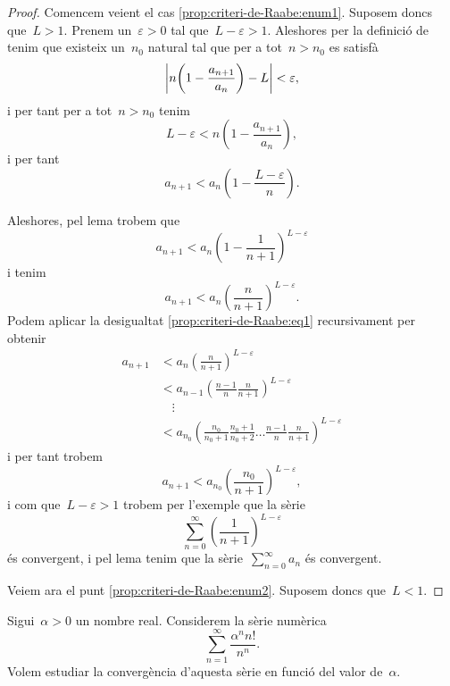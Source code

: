 \documentclass[../analisi-matematica.tex]{subfiles}
\begin{document}
    \begin{proof}
        Comencem veient el cas \eqref{prop:criteri-de-Raabe:enum1}.
        Suposem doncs que~\(L>1\).
        Prenem un~\(\varepsilon>0\) tal que~\(L-\varepsilon>1\).
        Aleshores per la definició de  tenim que existeix un~\(n_{0}\) natural tal que per a tot~\(n>n_{0}\) es satisfà
        \[
            \abs{n\left(1-\frac{a_{n+1}}{a_{n}}\right)-L}<\varepsilon,
        \]
        i per tant per a tot~\(n>n_{0}\) tenim
        \[
            L-\varepsilon<n\left(1-\frac{a_{n+1}}{a_{n}}\right),
        \]
        i per tant
        \[
            a_{n+1}<a_{n}\left(1-\frac{L-\varepsilon}{n}\right).
        \]

        Aleshores, pel lema  trobem que
        \[
            a_{n+1}<a_{n}\left(1-\frac{1}{n+1}\right)^{L-\varepsilon}
        \]
        i tenim
        \begin{equation}
            \label{prop:criteri-de-Raabe:eq1}
            a_{n+1}<a_{n}\left(\frac{n}{n+1}\right)^{L-\varepsilon}.
        \end{equation}
        Podem aplicar la desigualtat \eqref{prop:criteri-de-Raabe:eq1} recursivament per obtenir
        \begin{align*}
            a_{n+1}&<a_{n}\left(\frac{n}{n+1}\right)^{L-\varepsilon}\\
            &<a_{n-1}\left(\frac{n-1}{n}\frac{n}{n+1}\right)^{L-\varepsilon}\\
            &\quad\vdots\\
            &<a_{n_{0}}\left(\frac{n_{0}}{n_{0}+1}\frac{n_{0}+1}{n_{0}+2}\dots\frac{n-1}{n}\frac{n}{n+1}\right)^{L-\varepsilon}
        \end{align*}
        i per tant trobem
        \[
            a_{n+1}<a_{n_{0}}\left(\frac{n_{0}}{n+1}\right)^{L-\varepsilon},
        \]
        i com que~\(L-\varepsilon>1\) trobem per l'exemple  que la sèrie
        \[
            \sum_{n=0}^{\infty}\left(\frac{1}{n+1}\right)^{L-\varepsilon}
        \]
        és convergent, i pel lema  tenim que la sèrie~\(\sum_{n=0}^{\infty}a_{n}\) és convergent.

        Veiem ara el punt \eqref{prop:criteri-de-Raabe:enum2}.
        Suposem doncs que~\(L<1\).
    \end{proof}
    \begin{example}
        \label{ex:quocient-Raabe}
        Sigui~\(\alpha>0\) un nombre real.
        Considerem la sèrie numèrica
        \begin{equation}
            \label{ex:quocient-Raabe:eq1}
            \sum_{n=1}^{\infty}\frac{\alpha^{n}n!}{n^{n}}.
        \end{equation}
        Volem estudiar la convergència d'aquesta sèrie en funció del valor de~\(\alpha\).
    \end{example}
\end{document}
